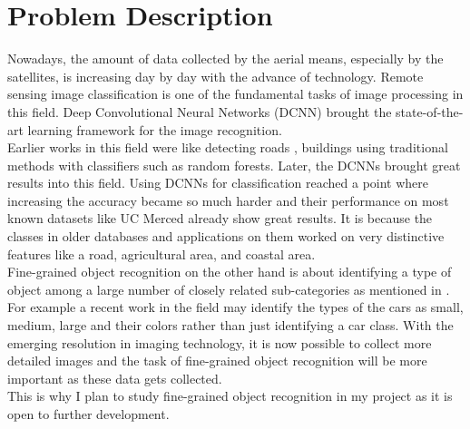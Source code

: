 \documentclass[10pt,journal,onecolumn]{IEEEtran}
\begin{document}
\section{Problem Description}
	Nowadays, the amount of data collected by the aerial means, especially by the satellites, is increasing day by day with the advance of technology. Remote sensing image classification is one of the fundamental tasks of image processing in this field. Deep Convolutional Neural Networks (DCNN)\cite{krizhevsky2012imagenet} brought the state-of-the-art learning framework for the image recognition. \\
\indent Earlier works in this field were like detecting roads \cite{mnih2010learning} \cite{alshehhi2017simultaneous}, buildings \cite{akccay2010building} \cite{vakalopoulou2015building} using traditional methods with classifiers such as random forests. Later, the DCNNs brought great results into this field. Using DCNNs for classification reached a point where increasing the accuracy became so much harder and their performance on most known datasets like UC Merced \cite{yang2010bag} already show great results. It is because the classes in older databases and applications on them worked on very distinctive features like a road, agricultural area, and coastal area. \\
\indent Fine-grained object recognition on the other hand is about identifying a type of object among a large number of closely related sub-categories as mentioned in \cite{sumbul2019multisource}. For example a recent work in the field may identify the types of the cars as small, medium, large and their colors rather than just identifying a car class. With the emerging resolution in imaging technology, it is now possible to collect more detailed images and the task of fine-grained object recognition will be more important as these data gets collected. \\
\indent This is why I plan to study fine-grained object recognition in my project as it is open to further development.

% 
%
%
\end{document}
